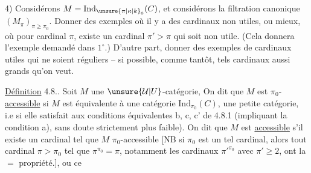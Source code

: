 4) Considérons $M=\mathrm{Ind}_{\unsure{\pi|\kappa|k}_0}(C)$,   et considérons la filtration canonique $(M_\pi)_{\pi\geq\pi_0}$.  Donner des exemples  où il y a des cardinaux non utiles, ou mieux, où pour  cardinal $\pi$, existe un cardinal $\pi'>\pi$ qui soit non utile. (Cela donnera l'exemple demandé dans $1^\circ$.) D'autre part, donner des exemples de cardinaux utiles qui ne soient réguliers -- si possible, comme tantôt,  tels cardinaux aussi grands qu'on veut. \par\hfill\unsure{$\backslash$}\hfill\null

\uline{Définition} 4.8.. Soit $M$ une $\unsure{\mathcal U|U}$-catégorie,  On dit que $M$ est $\pi_0$-\uline{accessible} si $M$ est équivalente à une catégorie $\mathrm{Ind}_{\pi_0}(C)$,  une petite catégorie, i.e si elle satisfait aux conditions équivalentes b, c, c' de 4.8.1 (impliquant la condition a), sans doute strictement plus faible). On dit que $M$ est \uline{accessible} s'il existe un cardinal tel que $M$  $\pi_0$-accessible [NB si $\pi_0$ est un tel cardinal, alors tout cardinal $\pi>\pi_0$ tel que $\pi^{\pi_0}=\pi$, notamment les cardinaux $\pi'^{\pi_0}$ avec $\pi'\geq2$, ont la $=$ propriété.], ou ce
